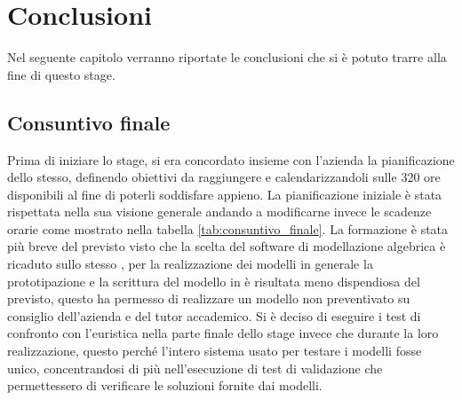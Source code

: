 
\hypertarget{(chap:capitolo8)}{}
\chapter{Conclusioni}
Nel seguente capitolo verranno riportate le conclusioni che si è potuto trarre alla fine di questo stage.
\section{Consuntivo finale}
Prima di iniziare lo stage, si era concordato insieme con l'azienda la pianificazione dello stesso, definendo obiettivi da raggiungere e calendarizzandoli sulle 320 ore disponibili al fine di poterli soddisfare appieno. La pianificazione iniziale è stata rispettata nella sua visione generale andando a modificarne invece le scadenze orarie come mostrato nella tabella \ref{tab:consuntivo_finale}. La formazione è stata più breve del previsto visto che la scelta del software di modellazione algebrica è ricaduto sullo stesso , per la realizzazione dei modelli in generale la prototipazione e la scrittura del modello in  è risultata meno dispendiosa del previsto, questo ha permesso di realizzare un modello non preventivato su consiglio dell'azienda e del tutor accademico.
Si è deciso di eseguire i test di confronto con l'euristica nella parte finale dello stage invece che durante la loro realizzazione, questo perché l'intero sistema usato per testare i modelli fosse unico, concentrandosi di più nell'esecuzione di test di validazione che permettessero di verificare le soluzioni fornite dai modelli.

